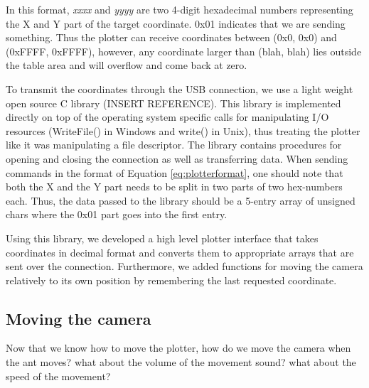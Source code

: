 In this format, \textit{xxxx} and \textit{yyyy} are two 4-digit hexadecimal numbers representing the X and Y part of the target coordinate. 0x01 indicates that we are sending something. Thus the plotter can receive coordinates between (0x0, 0x0) and (0xFFFF, 0xFFFF), however, any coordinate larger than (blah, blah) lies outside the table area and will overflow and come back at zero.

To transmit the coordinates through the USB connection, we use a light weight open source C library (INSERT REFERENCE). This library is implemented directly on top of the operating system specific calls for manipulating I/O resources (WriteFile() in Windows and write() in Unix), thus treating the plotter like it was manipulating a file descriptor. The library contains procedures for opening and closing the connection as well as transferring data. When sending commands in the format of Equation \ref{eq:plotterformat}, one should note that both the X and the Y part needs to be split in two parts of two hex-numbers each. Thus, the data passed to the library should be a 5-entry array of unsigned chars where the 0x01 part goes into the first entry.

Using this library, we developed a high level plotter interface that takes coordinates in decimal format and converts them to appropriate arrays that are sent over the connection. Furthermore, we added functions for moving the camera relatively to its own position by remembering the last requested coordinate.


 
\subsection{Moving the camera}
Now that we know how to move the plotter, how do we move the camera when the ant moves?
what about the volume of the movement sound?
what about the speed of the movement?
